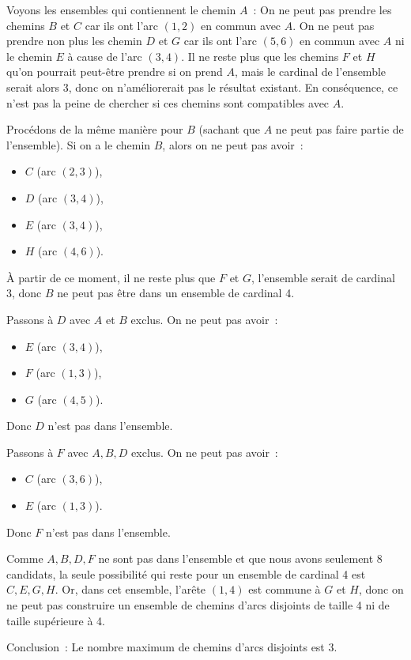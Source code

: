 \documentclass{article}
\begin{document}
Voyons les ensembles qui contiennent le chemin $A$~: On ne peut pas
prendre les chemins $B$ et $C$ car ils ont l'arc $(1,2)$ en commun
avec $A$. On ne peut pas prendre non plus les chemin $D$ et $G$ car
ils ont l'arc $(5,6)$ en commun avec $A$ ni le chemin $E$ à cause de
l'arc $(3,4)$. Il ne reste plus que les chemins $F$ et $H$ qu'on
pourrait peut-être prendre si on prend $A$, mais le cardinal de
l'ensemble serait alors 3, donc on n'améliorerait pas le résultat
existant. En conséquence, ce n'est pas la peine de chercher si ces chemins
sont \og compatibles\fg{} avec $A$.

Procédons de la même manière pour $B$ (sachant que $A$ ne peut pas
faire partie de l'ensemble). Si on a le chemin $B$, alors on ne peut
pas avoir~:
\begin{itemize}
  \item $C$ (arc $(2,3)$),
  \item $D$ (arc $(3,4)$),
  \item $E$ (arc $(3,4)$),
  \item $H$ (arc $(4,6)$).
\end{itemize}
À partir de ce moment, il ne reste plus que $F$ et $G$, l'ensemble
serait de cardinal 3, donc $B$ ne peut pas être dans un ensemble de
cardinal 4.

Passons à $D$ avec $A$ et $B$ exclus. On ne peut pas avoir~:
\begin{itemize}
\item $E$ (arc $(3,4)$),
\item $F$ (arc $(1,3)$),
\item $G$ (arc $(4,5)$).
\end{itemize}
Donc $D$ n'est pas dans l'ensemble.

Passons à $F$ avec $A,B,D$ exclus. On ne peut pas avoir~:
\begin{itemize}
\item $C$ (arc $(3,6)$),
\item $E$ (arc $(1,3)$).
\end{itemize}
Donc $F$ n'est pas dans l'ensemble.

Comme $A,B,D,F$ ne sont pas dans l'ensemble et que nous avons
seulement 8 candidats, la seule possibilité qui reste pour un ensemble
de cardinal 4 est $C,E,G,H$. Or, dans cet ensemble, l'arête $(1,4)$
est commune à $G$ et $H$, donc on ne peut pas construire un ensemble
de chemins d'arcs disjoints de taille 4 ni de taille supérieure
à 4.

Conclusion~: Le nombre maximum de chemins d'arcs disjoints est 3.
\end{document}
